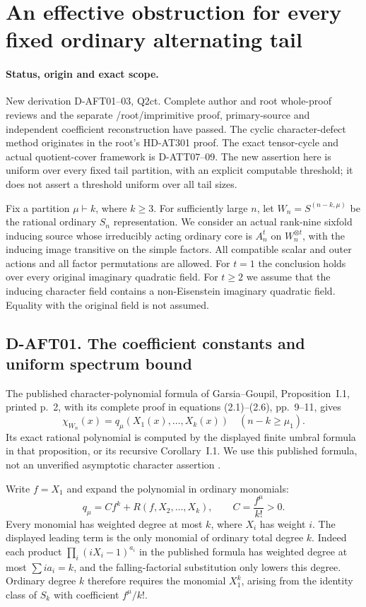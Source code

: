 \section{An effective obstruction for every fixed ordinary alternating tail}
\label{sec:effective-fixed-tail}

\paragraph{Status, origin and exact scope.}
New derivation D-AFT01--03, Q2ct. Complete author and root
whole-proof reviews and the separate /root/imprimitive proof,
primary-source and independent coefficient reconstruction have passed.
The cyclic character-defect method originates in the root's
HD-AT301 proof. The exact tensor-cycle and actual quotient-cover
framework is D-ATT07--09. The new assertion here is uniform over
every fixed tail partition, with an explicit computable threshold;
it does not assert a threshold uniform over all tail sizes.

Fix a partition $\mu\vdash k$, where $k\ge3$. For sufficiently
large $n$, let $W_n=S^{(n-k,\mu)}$ be the rational ordinary
$S_n$ representation. We consider an actual rank-nine sixfold
inducing source whose irreducibly acting ordinary core is $A_n^t$
on $W_n^{\otimes t}$, with the inducing image transitive on the
simple factors. All compatible scalar and outer actions and all
factor permutations are allowed. For $t=1$ the conclusion holds
over every original imaginary quadratic field. For $t\ge2$ we
assume that the inducing character field contains a non-Eisenstein
imaginary quadratic field. Equality with the original field is
not assumed.

\subsection*{D-AFT01. The coefficient constants and uniform spectrum bound}

The published character-polynomial formula of Garsia--Goupil,
Proposition~I.1, printed p.~2, with its complete proof in
equations (2.1)--(2.6), pp.~9--11, gives
\[
 \chi_{W_n}(x)=q_\mu(X_1(x),\ldots,X_k(x))
 \quad(n-k\ge\mu_1).                                  \tag{AFT.1}
\]
Its exact rational polynomial is computed by the displayed
finite umbral formula in that proposition, or its recursive
Corollary~I.1. We use this published formula, not an unverified
asymptotic character assertion \cite{HD:GarsiaGoupil2009}.

Write $f=X_1$ and expand the polynomial in ordinary monomials:
\[
 q_\mu=Cf^k+R(f,X_2,\ldots,X_k),\qquad
 C=\frac{f^\mu}{k!}>0.                                 \tag{AFT.2}
\]
Every monomial has weighted degree at most $k$, where $X_i$
has weight $i$. The displayed leading term is the only monomial
of ordinary total degree $k$. Indeed each product
$\prod_i(iX_i-1)^{a_i}$ in the published formula has weighted
degree at most $\sum ia_i=k$, and the falling-factorial
substitution only lowers this degree. Ordinary degree $k$
therefore requires the monomial $X_1^k$, arising from the
identity class of $S_k$ with coefficient $f^\mu/k!$.

